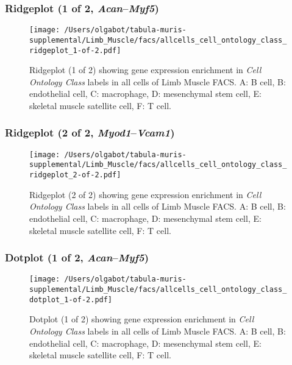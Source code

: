 \clearpage

\subsubsection{Ridgeplot (1 of 2, \emph{Acan}--\emph{Myf5})}
\begin{figure}[h]
\centering
\texttt{[image: /Users/olgabot/tabula-muris-supplemental/Limb\_Muscle/facs/allcells\_cell\_ontology\_class\_ridgeplot\_1-of-2.pdf]}

\caption{ Ridgeplot (1 of 2)  showing gene expression enrichment in \emph{Cell Ontology Class} labels in all cells of Limb Muscle FACS. A: B cell, B: endothelial cell, C: macrophage, D: mesenchymal stem cell, E: skeletal muscle satellite cell, F: T cell.}
\end{figure}


\clearpage

\subsubsection{Ridgeplot (2 of 2, \emph{Myod1}--\emph{Vcam1})}
\begin{figure}[h]
\centering
\texttt{[image: /Users/olgabot/tabula-muris-supplemental/Limb\_Muscle/facs/allcells\_cell\_ontology\_class\_ridgeplot\_2-of-2.pdf]}

\caption{ Ridgeplot (2 of 2)  showing gene expression enrichment in \emph{Cell Ontology Class} labels in all cells of Limb Muscle FACS. A: B cell, B: endothelial cell, C: macrophage, D: mesenchymal stem cell, E: skeletal muscle satellite cell, F: T cell.}
\end{figure}


\clearpage

\subsubsection{Dotplot (1 of 2, \emph{Acan}--\emph{Myf5})}
\begin{figure}[h]
\centering
\texttt{[image: /Users/olgabot/tabula-muris-supplemental/Limb\_Muscle/facs/allcells\_cell\_ontology\_class\_dotplot\_1-of-2.pdf]}

\caption{ Dotplot (1 of 2)  showing gene expression enrichment in \emph{Cell Ontology Class} labels in all cells of Limb Muscle FACS. A: B cell, B: endothelial cell, C: macrophage, D: mesenchymal stem cell, E: skeletal muscle satellite cell, F: T cell.}
\end{figure}


